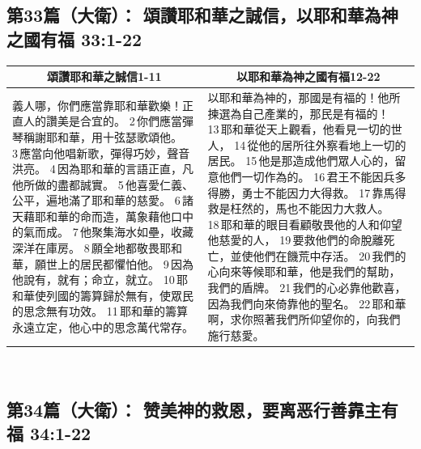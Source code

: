 \subsection{第33篇（大衛）： 頌讚耶和華之誠信，以耶和華為神之國有福 33:1-22}
\begin{table}[H]
\centering
\begin{tabular}{p{8.25cm}|p{}}\hline\hline
\multicolumn{1}{c|}{頌讚耶和華之誠信1-11}&\multicolumn{1}{c}{以耶和華為神之國有福12-22}\\\hline
義人哪，你們應當靠耶和華歡樂！正直人的讚美是合宜的。
2 你們應當彈琴稱謝耶和華，用十弦瑟歌頌他。
3 應當向他唱新歌，彈得巧妙，聲音洪亮。
4 因為耶和華的言語正直，凡他所做的盡都誠實。
5 他喜愛仁義、公平，遍地滿了耶和華的慈愛。
6 諸天藉耶和華的命而造，萬象藉他口中的氣而成。
7 他聚集海水如壘，收藏深洋在庫房。
8 願全地都敬畏耶和華，願世上的居民都懼怕他。
9 因為他說有，就有；命立，就立。
10 耶和華使列國的籌算歸於無有，使眾民的思念無有功效。
11 耶和華的籌算永遠立定，他心中的思念萬代常存。
&以耶和華為神的，那國是有福的！他所揀選為自己產業的，那民是有福的！
13 耶和華從天上觀看，他看見一切的世人，
14 從他的居所往外察看地上一切的居民。
15 他是那造成他們眾人心的，留意他們一切作為的。
16 君王不能因兵多得勝，勇士不能因力大得救。
17 靠馬得救是枉然的，馬也不能因力大救人。
18 耶和華的眼目看顧敬畏他的人和仰望他慈愛的人，
19 要救他們的命脫離死亡，並使他們在饑荒中存活。
20 我們的心向來等候耶和華，他是我們的幫助，我們的盾牌。
21 我們的心必靠他歡喜，因為我們向來倚靠他的聖名。
22 耶和華啊，求你照著我們所仰望你的，向我們施行慈愛。\\\hline
\end{tabular}
\end{table} 


\subsection{第34篇（大衛）： 赞美神的救恩，要离恶行善靠主有福 34:1-22}



